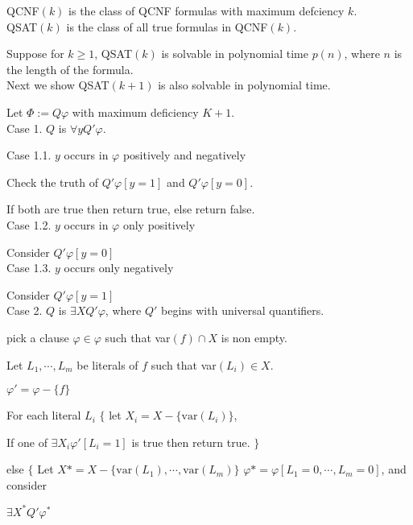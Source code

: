 \documentclass[12pt]{article}
\begin{document}
QCNF$(k)$ is the class of QCNF formulas with maximum defciency $k$. \\

QSAT$(k)$ is the class of all true formulas in QCNF$(k)$. 

Suppose for $k\geq 1$, QSAT$(k)$ is solvable in polynomial time $p(n)$, where $n$ is the length of the formula. \\

Next we show QSAT$(k+1)$ is also solvable in polynomial time. 

Let $\Phi:=Q\varphi$ with maximum deficiency $K+1$.\\

Case 1. $Q$ is $\forall y Q'\varphi$. 

Case 1.1. $y$ occurs in $\varphi$ positively and negatively 

      Check the truth of $Q'\varphi[y=1]$ and $Q'\varphi[y=0]$.  
      
      If both are true then return true, else return false. \\
      
Case 1.2. $y$ occurs in $\varphi$ only positively

      Consider $Q'\varphi[y=0]$\\
      
Case 1.3. $y$ occurs only negatively 

      Consider $Q'\varphi[y=1]$\\
      

Case 2. $Q$ is $\exists XQ'\varphi$, where $Q'$ begins with universal quantifiers. 

pick a clause $\varphi\in \varphi$ such that var$(f)\cap X$ is non empty.

Let $L_1, \cdots, L_m$ be literals of $f$ such that var$(L_i)\in X$.

$\varphi'=\varphi-\{f\}$ %

For each literal $L_i$ $\{$ let $X_i=X-\{\text{var}(L_i)\}$,    

If one of $\exists X_i \varphi'[L_i=1]$ is true then return true. $\}$

else $\{$ Let $X*=X-\{\text{var}(L_1),\cdots, \text{var}(L_m)\}$ $\varphi*=\varphi[L_1=0,\cdots,L_m=0]$, and consider

$\exists X^*Q'\varphi^* $      
      
      
  \   \\
  
\end{document}
